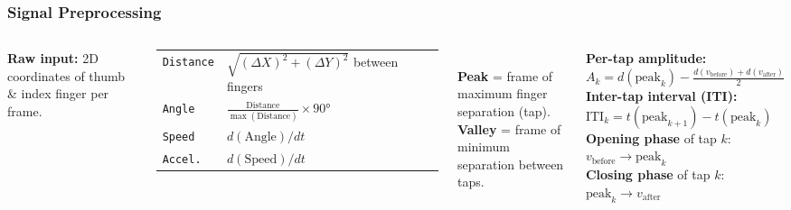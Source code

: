 \documentclass[aspectratio=169]{beamer}
\begin{document}
\begin{frame}
    \frametitle{Signal Preprocessing}
    \scriptsize
    \begin{columns}[T]
        \textbf{Raw input:} 2D coordinates of thumb \& index finger per frame.\\[0.4em]
        \begin{tabular}{p{1.8cm}p{5.0cm}}
            \texttt{Distance} & $\sqrt{(\Delta X)^2+(\Delta Y)^2}$ between fingers \\[0.3em]
            \texttt{Angle}    & $\frac{\text{Distance}}{\max(\text{Distance})}\times 90°$ \\[0.3em]
            \texttt{Speed}    & $d(\text{Angle})/dt$ \\[0.3em]
            \texttt{Accel.}   & $d(\text{Speed})/dt$ \\
        \end{tabular}\\[0.5em]
        \textbf{Peak} = frame of maximum finger separation (tap).\\
        \textbf{Valley} = frame of minimum separation between taps.

        \textbf{Per-tap amplitude:}\\
        $A_k = d(\text{peak}_k) - \tfrac{d(v_\text{before})+d(v_\text{after})}{2}$\\[0.5em]
        \textbf{Inter-tap interval (ITI):}\\
        $\text{ITI}_k = t(\text{peak}_{k+1}) - t(\text{peak}_k)$\\[0.5em]
        \textbf{Opening phase} of tap $k$: $v_\text{before} \to \text{peak}_k$\\
        \textbf{Closing phase} of tap $k$: $\text{peak}_k \to v_\text{after}$
    \end{columns}
\end{frame}
\end{document}
